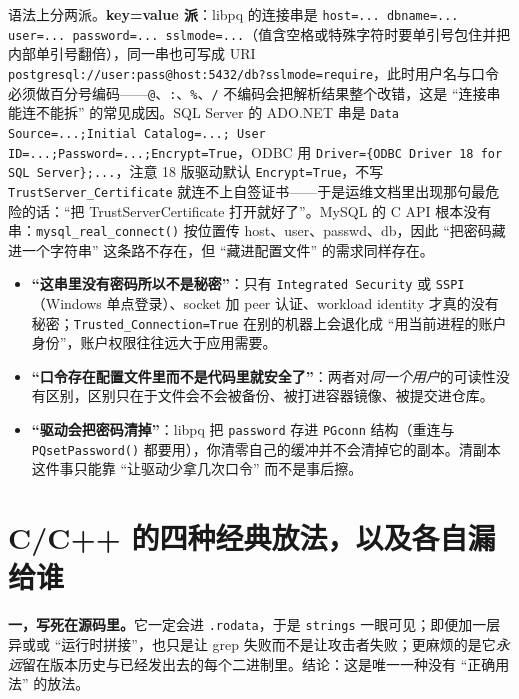 \documentclass[12pt,a4paper,fontset=fandol]{ctexbook}
\newcommand{\Fn}[1]{\texttt{#1()}}
\newcommand{\Tp}[1]{\texttt{#1}}
\newcommand{\CppJava}{C/C++}
\begin{document}
语法上分两派。\textbf{key=value 派}：libpq 的连接串是 \texttt{host=... dbname=... user=... password=... sslmode=...}（值含空格或特殊字符时要单引号包住并把内部单引号翻倍），同一串也可写成 URI \texttt{postgresql://\allowbreak{}\allowbreak user:pass@\allowbreak host:5432/\allowbreak{}\allowbreak db?sslmode=\allowbreak require}，此时用户名与口令必须做百分号编码——\texttt{@}、\texttt{:}、\texttt{\%}、\texttt{/} 不编码会把解析结果整个改错，这是 ``连接串能连不能拆'' 的常见成因。SQL Server 的 ADO.NET 串是 \texttt{Data Source=...;Initial Catalog=...; User ID=...;Password=...;Encrypt=True}，ODBC 用 \texttt{Driver=\{ODBC Driver 18 for SQL Server\};...}，注意 18 版驱动默认 \Tp{Encrypt=True}，不写 \Tp{Trust\allowbreak{}Server\_\allowbreak{}\allowbreak Certificate} 就连不上自签证书——于是运维文档里出现那句最危险的话：``把 TrustServer\allowbreak Certificate 打开就好了''。MySQL 的 C API 根本没有串：\Fn{mysql\_\allowbreak{}real\_\allowbreak{}connect} 按位置传 host、user、passwd、db，因此 ``把密码藏进一个字符串'' 这条路不存在，但 ``藏进配置文件'' 的需求同样存在。

\begin{warning}[title=连接串里的三个假安全]
\begin{itemize}
  \item \textbf{``这串里没有密码所以不是秘密''}：只有 \Tp{Integrated Security} 或 \Tp{SSPI}（Windows 单点登录）、socket 加 peer 认证、workload identity 才真的没有秘密；\Tp{Trusted\_Connection=True} 在别的机器上会退化成 ``用当前进程的账户身份''，账户权限往往远大于应用需要。
  \item \textbf{``口令存在配置文件里而不是代码里就安全了''}：两者对\emph{同一个用户}的可读性没有区别，区别只在于文件会不会被备份、被打进容器镜像、被提交进仓库。
  \item \textbf{``驱动会把密码清掉''}：libpq 把 \Tp{password} 存进 \Tp{PGconn} 结构（重连与 \Fn{PQset\allowbreak{}Password} 都要用），你清零自己的缓冲并不会清掉它的副本。清副本这件事只能靠 ``让驱动少拿几次口令'' 而不是事后擦。
\end{itemize}
\end{warning}

\section{\CppJava{} 的四种经典放法，以及各自漏给谁}

\textbf{一，写死在源码里。}它一定会进 \Tp{.rodata}，于是 \texttt{strings} 一眼可见；即便加一层异或或 ``运行时拼接''，也只是让 grep 失败而不是让攻击者失败；更麻烦的是它\emph{永远}留在版本历史与已经发出去的每个二进制里。结论：这是唯一一种没有 ``正确用法'' 的放法。
\end{document}
